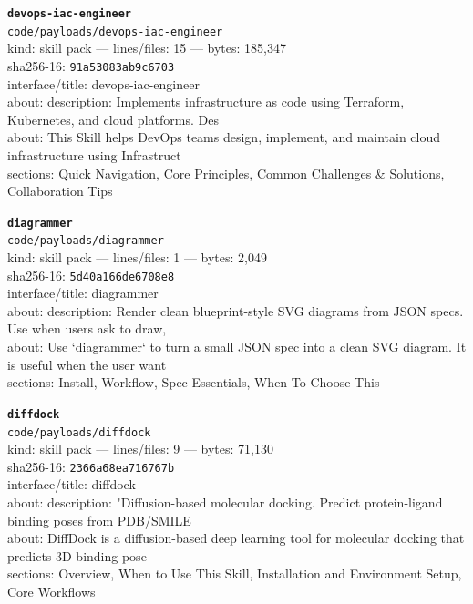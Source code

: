 \noindent\textbf{\texttt{devops-iac-engineer}}\\
\texttt{code/payloads/devops-iac-engineer}\\
kind: skill pack --- lines/files: 15 --- bytes: 185,347\\
sha256-16: \texttt{91a53083ab9c6703}\\
interface/title: devops-iac-engineer\\
about: description: Implements infrastructure as code using Terraform, Kubernetes, and cloud platforms. Des\\
about: This Skill helps DevOps teams design, implement, and maintain cloud infrastructure using Infrastruct\\
sections: Quick Navigation, Core Principles, Common Challenges \& Solutions, Collaboration Tips\\
\vspace*{6.0pt}

\noindent\textbf{\texttt{diagrammer}}\\
\texttt{code/payloads/diagrammer}\\
kind: skill pack --- lines/files: 1 --- bytes: 2,049\\
sha256-16: \texttt{5d40a166de6708e8}\\
interface/title: diagrammer\\
about: description: Render clean blueprint-style SVG diagrams from JSON specs. Use when users ask to draw, \\
about: Use `diagrammer` to turn a small JSON spec into a clean SVG diagram. It is useful when the user want\\
sections: Install, Workflow, Spec Essentials, When To Choose This\\
\vspace*{6.0pt}
\newpage

\noindent\textbf{\texttt{diffdock}}\\
\texttt{code/payloads/diffdock}\\
kind: skill pack --- lines/files: 9 --- bytes: 71,130\\
sha256-16: \texttt{2366a68ea716767b}\\
interface/title: diffdock\\
about: description: "Diffusion-based molecular docking. Predict protein-ligand binding poses from PDB/SMILE\\
about: DiffDock is a diffusion-based deep learning tool for molecular docking that predicts 3D binding pose\\
sections: Overview, When to Use This Skill, Installation and Environment Setup, Core Workflows\\
\vspace*{6.0pt}

